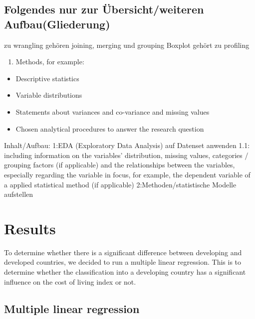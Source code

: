 \documentclass[
  11pt,
  a4paper,
  twoside]{scrbook}
\providecommand{\tightlist}{%
  \setlength{\itemsep}{0pt}\setlength{\parskip}{0pt}}
\begin{document}
\hypertarget{folgendes-nur-zur-uxfcbersichtweiteren-aufbaugliederung}{%
\section{Folgendes nur zur Übersicht/weiteren Aufbau(Gliederung)}\label{folgendes-nur-zur-uxfcbersichtweiteren-aufbaugliederung}}

zu wrangling gehören joining, merging und grouping
Boxplot gehört zu profiling

\begin{enumerate}
\def\labelenumi{\arabic{enumi}.}
\setcounter{enumi}{2}
\tightlist
\item
  Methods, for example:
\end{enumerate}

\begin{itemize}
\tightlist
\item
  Descriptive statistics
\item
  Variable distributions
\item
  Statements about variances and co-variance and missing values
\item
  Chosen analytical procedures to answer the research question
\end{itemize}

Inhalt/Aufbau:
1:EDA (Exploratory Data Analysis) auf Datenset anwenden
1.1: including information on the variables' distribution, missing values,
categories / grouping factors (if applicable) and the relationships between the variables, especially
regarding the variable in focus, for example, the dependent variable of a applied statistical method (if
applicable)
2:Methoden/statistische Modelle aufstellen

\hypertarget{results}{%
\chapter{Results}\label{results}}

To determine whether there is a significant difference between developing and developed countries, we decided to run a multiple linear regression. This is to determine whether the classification into a developing country has a significant influence on the cost of living index or not.

\hypertarget{multiple-linear-regression}{%
\section{Multiple linear regression}\label{multiple-linear-regression}}
\end{document}
